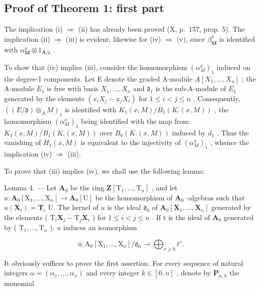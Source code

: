 \subsection{Proof of Theorem 1: first part}

The implication (i) \(\Rightarrow\) (ii) has already been proved (X, p.~157, prop. 5). The implication (ii) \(\Rightarrow\) (iii) is evident; likewise for (iv) \(\Rightarrow\) (v), since \(\beta_{\mathbf{M}}^{x}\) is identified with \(\alpha_{\mathbf{M}}^{x} \otimes 1_{\mathbf{A}/\mathfrak{x}}\) .

To show that (iv) implies (iii), consider the homomorphism \((\alpha_{M}^{x})_{1}\) induced on the degree-1 components. Let E denote the graded A-module \(A[X_{1},\ldots,X_{n}]\) ; the A-module \(E_{1}\) is free with basis \(X_{1},\ldots,X_{n}\) and \(\mathfrak{d}_{1}\) is the sub-A-module of \(E_{1}\) generated by the elements \((x_{i}X_{j}-x_{j}X_{i})\) for \(1\leqslant i<j\leqslant n\) . Consequently, \(((E/\mathfrak{d})\otimes_{A}M)_{1}\) is identified with \(K_{1}(x,M)/B_{1}(K.(x,M))\) , the homomorphism \((\alpha_{M}^{x})_{1}\) being identified with the map from \(K_{1}(x,M)/B_{1}(K.(x,M))\) over \(B_{0}(K.(x,M))\) induced by \(d_{1}\) . Thus the vanishing of \(H_{1}(x,M)\) is equivalent to the injectivity of \((\alpha_{M}^{x})_{1}\) , whence the implication (iv) \(\Rightarrow\) (iii).

To prove that (iii) implies (iv), we shall use the following lemma:

Lemma 4. --- Let \(\mathbf{A}_{0}\) be the ring \(\mathbf{Z}[\mathrm{T}_{1},\ldots,\mathrm{T}_{n}]\) , and let \(u:\mathbf{A}_{0}[\mathrm{X}_{1},\ldots,\mathrm{X}_{n}] \to \mathbf{A}_{0}[\mathrm{U}]\) be the homomorphism of \(\mathbf{A}_{0}\) -algebras such that \(u(\mathbf{X}_{i}) = \mathbf{T}_{i}\) U. The kernel of \(u\) is the ideal \(\mathfrak{d}_{0}\) of \(\mathbf{A}_{0}[\mathbf{X}_{1},\ldots,\mathbf{X}_{n}]\) generated by the elements ( \(\mathrm{T}_{i}\mathbf{X}_{j}-\mathrm{T}_{j}\mathbf{X}_{i}\) ) for \(1 \leqslant i < j \leqslant n\) . If t is the ideal of \(\mathbf{A}_{0}\) generated by ( \(\mathrm{T}_{1},\ldots,\mathrm{T}_{n}\) ), \(u\) induces an isomorphism

\[
\overline {{u}}: \mathrm{A} _ {0} [ \mathrm{X} _ {1}, \dots , \mathrm{X} _ {n} ] / \mathfrak {d} _ {0} \rightarrow \bigoplus_ {r \geqslant 0} t ^ {r}.
\]

It obviously suffices to prove the first assertion. For every sequence of natural integers \(\alpha = (\alpha_{1},\ldots,\alpha_{n})\) and every integer \(k\in[0,n]\) , denote by \(\mathbf{P}_{\alpha,k}\) the monomial

